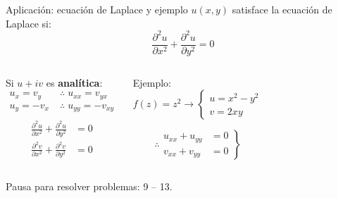 \documentclass[9pt, aspectratio=169]{beamer}
\begin{document}
\begin{frame}{Aplicación: ecuación de Laplace y ejemplo}
	$u(x, y)$ satisface la ecuación de Laplace si:
	\[\boxed{ \frac{\partial^2 u}{\partial x^2} + \frac{\partial^2 u}{\partial y^2} = 0 } \] \pause
	\vspace{1em}

	\begin{columns}[t]
		\cx
		Si $u + i v$ es \textbf{analítica}:
		\begin{align*}
			u_x = v_y \;  & \therefore \; u_{xx} = v_{yx}  \\
			u_y = -v_x \; & \therefore \; u_{yy} = -v_{xy} \\
		\end{align*} \vspace{-3em}
		\begin{align*}
			\frac{\partial^2 u}{\partial x^2} + \frac{\partial^2 u}{\partial y^2} & = 0 \\
			\frac{\partial^2 v}{\partial x^2} + \frac{\partial^2 v}{\partial y^2} & = 0
		\end{align*} \pause

		\cx
		\begin{exampleblock}{Ejemplo:}
			\[ f(z) = z^2 \longrightarrow
				\begin{cases}
					u = x^2 - y^2 \\
					v = 2 x y
				\end{cases}
			\]

			\[
				\therefore \left. { \begin{array}{ll}
					u_{xx} + u_{yy} & = 0 \\
					v_{xx} + v_{yy} & = 0
				\end{array} }
				\right\}
			\]
		\end{exampleblock}
	\end{columns}
\end{frame}

\begin{frame}[standout]
	Pausa para resolver problemas: 9 -- 13.
\end{frame}
\end{document}
